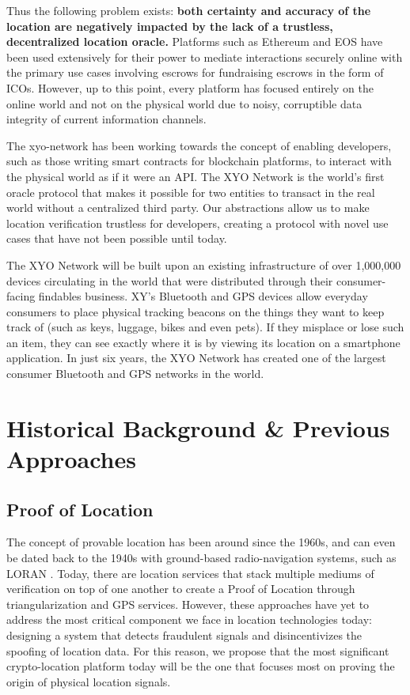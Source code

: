 \documentclass{article}
\begin{document}
\clearpage
Thus the following problem exists: \textbf{both \gls{certainty} and \gls{accuracy} of the location are negatively impacted by the lack of a trustless, decentralized location oracle.} Platforms such as Ethereum and EOS have been used extensively for their power to mediate interactions securely online with the primary use cases involving escrows for fundraising escrows in the form of ICOs. However, up to this point, every platform has focused entirely on the online world and not on the physical world due to noisy, corruptible data integrity of current information channels.

The \Gls{xyo-network} has been working towards the concept of enabling developers, such as those writing smart contracts for blockchain platforms, to interact with the physical world as if it were an API. The XYO Network is the world's first oracle protocol that makes it possible for two entities to transact in the real world without a centralized third party. Our abstractions allow us to make location verification trustless for developers, creating a protocol with novel use cases that have not been possible until today.

The XYO Network will be built upon an existing infrastructure of over 1,000,000 devices circulating in the world that were distributed through their consumer-facing findables business. XY's Bluetooth and GPS devices allow everyday consumers to place physical tracking beacons on the things they want to keep track of (such as keys, luggage, bikes and even pets). If they misplace or lose such an item, they can see exactly where it is by viewing its location on a smartphone application. In just six years, the XYO Network has created one of the largest consumer Bluetooth and GPS networks in the world.

\section{Historical Background \& Previous Approaches}
\subsection{Proof of Location}

The concept of provable location has been around since the 1960s, and can even be dated back to the 1940s with ground-based radio-navigation systems, such as LORAN \cite{blanchard-loran}. Today, there are location services that stack multiple mediums of verification on top of one another to create a Proof of Location through triangularization and GPS services. However, these approaches have yet to address the most critical component we face in location technologies today: designing a system that detects fraudulent signals and disincentivizes the spoofing of location data. For this reason, we propose that the most significant crypto-location platform today will be the one that focuses most on proving the origin of physical location signals.
\end{document}
